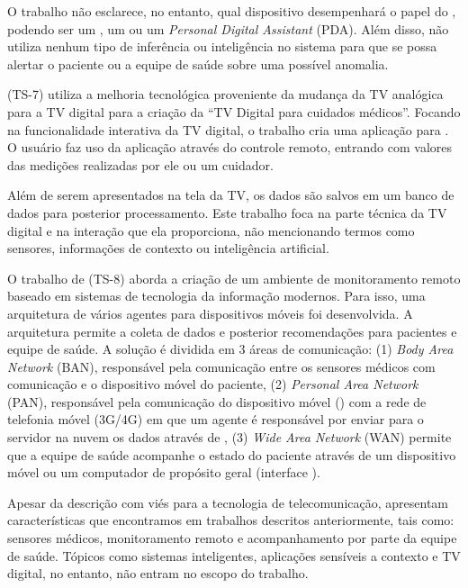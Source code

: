 O trabalho não esclarece, no entanto, qual dispositivo desempenhará o papel do
\gateway[], podendo ser um \tablet[], um \smartphone[] ou um \textit{Personal
Digital Assistant} (PDA). Além disso, não utiliza nenhum tipo de inferência ou
inteligência no sistema para que se possa alertar o paciente ou a equipe de
saúde sobre uma possível anomalia.

 (TS-7) utiliza a melhoria tecnológica proveniente da
mudança da TV analógica para a TV digital para a criação da ``TV Digital para
cuidados médicos''. Focando na funcionalidade interativa da TV digital,
o trabalho cria uma aplicação para \stb[]. O usuário faz uso da aplicação através
do controle remoto, entrando com valores das medições realizadas por ele ou um
cuidador. 

Além de serem apresentados na tela da TV, os dados são salvos
em um banco de dados para posterior processamento. Este trabalho foca na parte
técnica da TV digital e na interação que ela proporciona, não
mencionando termos como sensores, informações de contexto ou inteligência
artificial.

O trabalho de  (TS-8) aborda a criação de um ambiente de
monitoramento remoto baseado em sistemas de tecnologia da informação modernos.
Para isso, uma arquitetura de vários agentes para dispositivos móveis foi
desenvolvida. A arquitetura permite a coleta de dados e posterior recomendações
para pacientes e equipe de saúde. A solução é dividida em 3 áreas de
comunicação: (1) \textit{Body Area Network} (BAN), responsável pela comunicação
entre os sensores médicos com comunicação \bluetooth[] e o dispositivo móvel do
paciente,  (2) \textit{Personal Area Network} (PAN), responsável pela
comunicação do dispositivo móvel (\smartphone) com a rede de telefonia móvel
(3G/4G) em que um agente é responsável por enviar para o servidor na nuvem os dados
através de \webservices[],  (3) \textit{Wide Area Network} (WAN) permite que a equipe
de saúde acompanhe o estado do paciente através de um dispositivo móvel ou um
computador de propósito geral (interface \web).

Apesar da descrição com viés para a tecnologia de telecomunicação,
 apresentam características que encontramos em
trabalhos descritos anteriormente, tais como: sensores médicos, monitoramento
remoto e acompanhamento por parte da equipe de saúde. Tópicos como sistemas
inteligentes, aplicações sensíveis a contexto e TV digital, no entanto, não
entram no escopo do trabalho.

